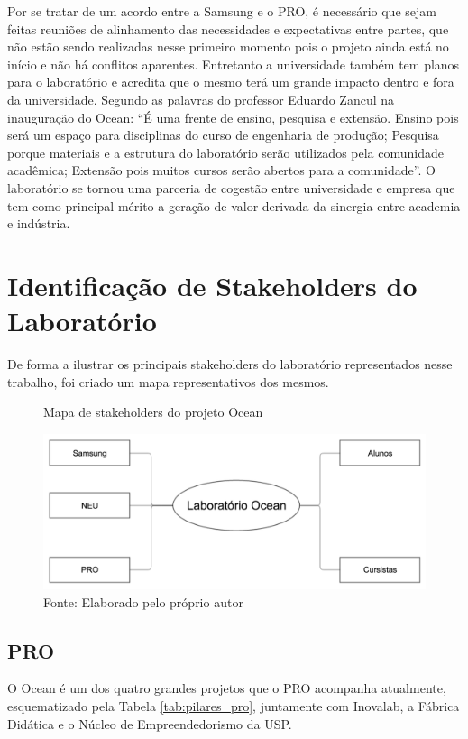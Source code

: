 Por se tratar de um acordo entre a Samsung e o PRO, é necessário que sejam feitas reuniões de alinhamento das necessidades e expectativas entre partes, que não estão sendo realizadas nesse primeiro momento pois o projeto ainda está no início e não há conflitos aparentes. Entretanto a universidade também tem planos para o laboratório e acredita que o mesmo terá um grande impacto dentro e fora da universidade. Segundo as palavras do professor Eduardo Zancul na inauguração do Ocean: “É uma frente de ensino, pesquisa e extensão. Ensino pois será um espaço para disciplinas do curso de engenharia de produção; Pesquisa porque materiais e a estrutura do laboratório serão utilizados pela comunidade acadêmica; Extensão pois muitos cursos serão abertos para a comunidade”. O laboratório se tornou uma parceria de cogestão entre universidade e empresa que tem como principal mérito a geração de valor derivada da sinergia entre academia e indústria. 

\section{Identificação de Stakeholders do Laboratório}
\label{sec:identificacao_stakeholders}

De forma a ilustrar os principais stakeholders do laboratório representados nesse trabalho, foi criado um mapa representativos dos mesmos. 

\begin{figure}[h]
\caption{Mapa de stakeholders do projeto Ocean}
\centerline{\includegraphics[scale=0.5]{img/stakeholders_v2}}
\label{fig:stakeholders}
\caption* {Fonte: Elaborado pelo próprio autor}
\end{figure}

\subsection{PRO}
\label{sec:con_pro}

O Ocean é um dos quatro grandes projetos que o PRO acompanha atualmente, esquematizado pela Tabela \ref{tab:pilares_pro}, juntamente com Inovalab, a Fábrica Didática e o Núcleo de Empreendedorismo da USP.

